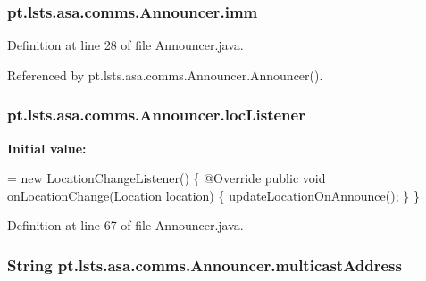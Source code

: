 \subsubsection[{imm}]{ pt.\+lsts.\+asa.\+comms.\+Announcer.\+imm\hspace{0.3cm}{\ttfamily [private]}}\label{classpt_1_1lsts_1_1asa_1_1comms_1_1Announcer_a899369bb5523890384993f85eea10fdd}


Definition at line 28 of file Announcer.\+java.



Referenced by pt.\+lsts.\+asa.\+comms.\+Announcer.\+Announcer().

\hypertarget{classpt_1_1lsts_1_1asa_1_1comms_1_1Announcer_a3e5ba0512f5ecc6368c17edf3143cd2b}{}
\subsubsection[{loc\+Listener}]{ pt.\+lsts.\+asa.\+comms.\+Announcer.\+loc\+Listener\hspace{0.3cm}{\ttfamily [private]}}\label{classpt_1_1lsts_1_1asa_1_1comms_1_1Announcer_a3e5ba0512f5ecc6368c17edf3143cd2b}
{\bfseries Initial value\+:}
\begin{DoxyCode}
= \textcolor{keyword}{new} LocationChangeListener() \{
        @Override
        \textcolor{keyword}{public} \textcolor{keywordtype}{void} onLocationChange(Location location) \{
            \hyperlink{classpt_1_1lsts_1_1asa_1_1comms_1_1Announcer_a7826694b7d80ba969a9b35f11959a142}{updateLocationOnAnnounce}();
        \}
    \}
\end{DoxyCode}


Definition at line 67 of file Announcer.\+java.

\hypertarget{classpt_1_1lsts_1_1asa_1_1comms_1_1Announcer_ac2278bc6a01e42484ffbd47efbe575e3}{}
\subsubsection[{multicast\+Address}]{\setlength{\rightskip}{0pt plus 5cm}String pt.\+lsts.\+asa.\+comms.\+Announcer.\+multicast\+Address\hspace{0.3cm}{\ttfamily [private]}}\label{classpt_1_1lsts_1_1asa_1_1comms_1_1Announcer_ac2278bc6a01e42484ffbd47efbe575e3}


